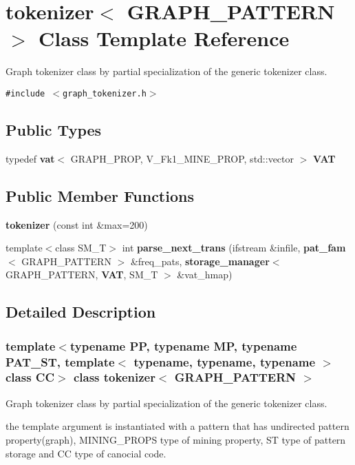 \section{tokenizer$<$ GRAPH\_\-PATTERN $>$ Class Template Reference}
\label{classtokenizer_3_01GRAPH__PATTERN_01_4}
Graph tokenizer class by partial specialization of the generic tokenizer class.  


{\tt \#include $<$graph\_\-tokenizer.h$>$}

\subsection*{Public Types}
\begin{CompactItemize}
\item 
typedef {\bf vat}$<$ GRAPH\_\-PROP, V\_\-Fk1\_\-MINE\_\-PROP, std::vector $>$ {\bf VAT}\label{classtokenizer_3_01GRAPH__PATTERN_01_4_w0}

\end{CompactItemize}
\subsection*{Public Member Functions}
\begin{CompactItemize}
\item 
{\bf tokenizer} (const  int \&max=200)
\item 
template$<$class SM\_\-T$>$ int {\bf parse\_\-next\_\-trans} (ifstream \&infile, {\bf pat\_\-fam}$<$ GRAPH\_\-PATTERN $>$ \&freq\_\-pats, {\bf storage\_\-manager}$<$ GRAPH\_\-PATTERN, {\bf VAT}, SM\_\-T $>$ \&vat\_\-hmap)
\end{CompactItemize}


\subsection{Detailed Description}
\subsubsection*{template$<$typename PP, typename MP, typename PAT\_\-ST, template$<$ typename, typename, typename $>$ class CC$>$ class tokenizer$<$ GRAPH\_\-PATTERN $>$}

Graph tokenizer class by partial specialization of the generic tokenizer class. 

the template argument is instantiated with a pattern that has undirected pattern property(graph), MINING\_\-PROPS type of mining property, ST type of pattern storage and CC type of canocial code. 



